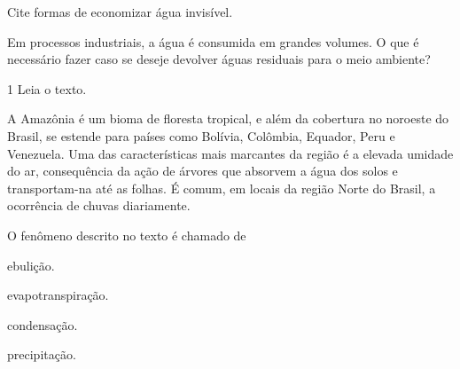 \begin{escolha}
\item Cite formas de economizar água invisível.



\item Em processos industriais, a água é consumida em grandes
volumes. O que é necessário fazer caso se deseje devolver águas
residuais para o meio ambiente?


\end{escolha}


\num{1} Leia o texto.

A Amazônia é um bioma de floresta tropical, e além da
cobertura no noroeste do Brasil, se estende para países como Bolívia,
Colômbia, Equador, Peru e Venezuela. Uma das características mais
marcantes da região é a elevada umidade do ar, consequência da ação de
árvores que absorvem a água dos solos e transportam-na até as folhas. É
comum, em locais da região Norte do Brasil, a ocorrência de chuvas
diariamente.

O fenômeno descrito no texto é chamado de

\begin{escolha}
\item ebulição.

\item evapotranspiração.

\item condensação.

\item precipitação.
\end{escolha}

